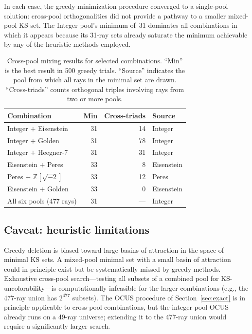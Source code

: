 \documentclass[twocolumn,pra,superscriptaddress,nofootinbib]{revtex4-2}
\newcommand{\Z}{\mathbb{Z}}
\begin{document}
In each case, the greedy minimization procedure converged to a single-pool
solution: cross-pool orthogonalities did not provide a pathway to a smaller
mixed-pool KS set. The Integer pool's minimum of~31 dominates all combinations
in which it appears because its 31-ray sets already saturate the minimum
achievable by any of the heuristic methods employed.

\begin{table}[t]
\centering
\caption{Cross-pool mixing results for selected combinations. ``Min'' is the
best result in 500 greedy trials. ``Source'' indicates the pool from which all
rays in the minimal set are drawn. ``Cross-triads'' counts orthogonal triples
involving rays from two or more pools.}
\label{tab:cross}
\begin{tabular}{lrrl}
\toprule
Combination & Min & Cross-triads & Source \\
\midrule
Integer $+$ Eisenstein & 31 & 14 & Integer \\
Integer $+$ Golden & 31 & 78 & Integer \\
Integer $+$ Heegner-7 & 31 & 31 & Integer \\
Eisenstein $+$ Peres & 33 & 8 & Eisenstein \\
Peres $+$ $\Z[\sqrt{-2}]$ & 33 & 12 & Peres \\
Eisenstein $+$ Golden & 33 & 0 & Eisenstein \\
All six pools (477 rays) & 31 & --- & Integer \\
\bottomrule
\end{tabular}
\end{table}

\subsection{Caveat: heuristic limitations}

Greedy deletion is biased toward large basins of attraction in the space of
minimal KS sets. A mixed-pool minimal set with a small basin of attraction could
in principle exist but be systematically missed by greedy methods. Exhaustive
cross-pool search---testing all subsets of a combined pool for
KS-uncolorability---is computationally infeasible for the larger combinations
(e.g., the 477-ray union has $2^{477}$ subsets). The OCUS procedure of
Section~\ref{sec:exact} is in principle applicable to cross-pool combinations,
but the integer pool OCUS already runs on a 49-ray universe; extending it to the
477-ray union would require a significantly larger search.
\end{document}
